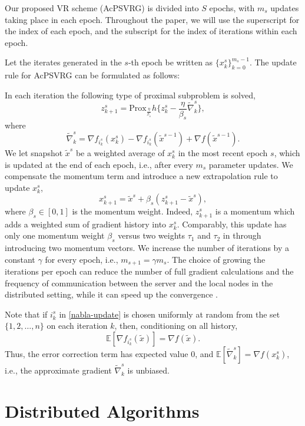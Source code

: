 \documentclass[letterpaper]{article} %
\newcommand*{\Po}{\text{Prox}}
\newcommand*{\E}{\mathbb{E}}
\begin{document}
Our proposed VR scheme (AcPSVRG) is divided into $S$ epochs, with $m_s$ updates taking place in each epoch.  Throughout the paper, we will
use the superscript for the index of each epoch, and the subscript for the index of iterations within each epoch.

Let the iterates generated in the $s$-th epoch be written as $\{x_k^s\}_{k=0}^{m_s-1}$. The update rule for AcPSVRG can be formulated as follows: 

In each iteration the following type of proximal subproblem is solved,
\begin{equation}
z_{k+1}^s = \Po_{\frac{\eta}{\beta_s}} h \{z_{k}^s - \frac{\eta}{\beta_s}\widetilde{\nabla}_k^s\},
\end{equation}
where
\begin{equation}\label{nabla-update}
\widetilde{\nabla}_k^s = \nabla f_{i_k^s}(x_k^s) - \nabla f_{i_k^s}(\widetilde{x}^{s-1}) + \nabla f(\widetilde{x}^{s-1}).
\end{equation}
We let snapshot $\widetilde{x}^s$ be a weighted average of $x_k^{s}$ in the most recent epoch $s$, which is updated at the end of each epoch, i.e., after every $m_s$ parameter updates. We compensate the momentum term and introduce a new extrapolation rule to update $x_k^{s}$,
\[
x_{k+1}^s = \widetilde{x}^s+\beta_s(z_{k+1}^s-\widetilde{x}^s),
\]
where $\beta_s \in [0, 1]$ is the momentum weight. Indeed, $z_{k+1}^s$ is a momentum which adds a weighted sum of gradient history into $x_k^{s}$. Comparably, this update has only one momentum weight $\beta_s$ versus two weights $\tau_1$ and $\tau_2$ in \cite{Allen-Zhu17} through introducing two momentum vectors.  
We increase the number of
iterations by a constant $\gamma$ for every epoch, i.e., $m_{s+1} = \gamma m_{s}$.
The choice of growing the iterations per epoch can reduce the number of full gradient calculations and the frequency of communication between
the server and the local nodes in the distributed setting, while it can speed up the convergence \cite{Allen-Zhu2016I}.

Note that if $i_k^s$ in \eqref{nabla-update} is chosen uniformly at random from the set $\{1,2,\ldots,n\}$ on each iteration $k$, then, conditioning on all history,
\[
\E[\nabla f_{i_k^s}(\widetilde{x})] = \nabla f(\widetilde{x}).
\] 
Thus, the error correction term has expected value $0$, and $\E[\widetilde{\nabla}_k^s] = \nabla f(x_{k}^s)$, i.e., the approximate gradient $\widetilde{\nabla}_k^s$ is unbiased.

\section{Distributed Algorithms}
\end{document}
